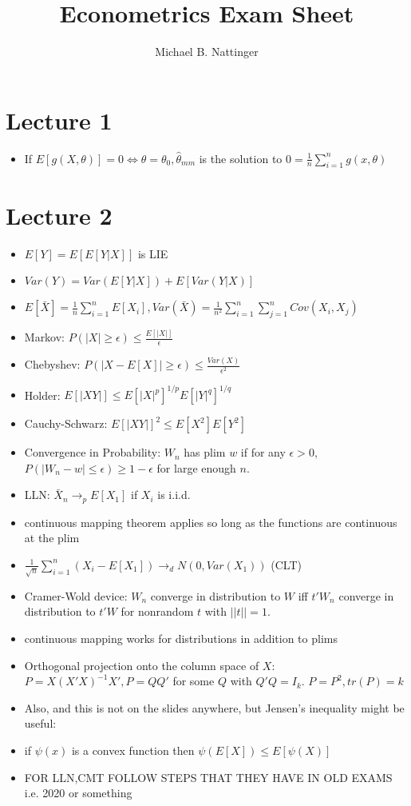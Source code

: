 \documentclass[11pt]{article} %
\title{Econometrics Exam Sheet}
\author{Michael B. Nattinger}
\begin{document}
\maketitle

\section{Lecture 1}
\begin{itemize}
\item If $E[g(X,\theta)] = 0 \iff \theta = \theta_0, \hat{\theta}_{mm}$ is the solution to $0 =  \frac{1}{n}\sum_{i=1}^n g(x,\theta)$
\end{itemize}
\section{Lecture 2}
\begin{itemize}
\item $E[Y] = E[E[Y|X]]$ is LIE
\item $Var(Y) = Var(E[Y|X]) + E[Var(Y|X)]$
\item $E[\bar{X}] = \frac{1}{n}\sum_{i=1}^n E[X_i], Var(\bar{X}) = \frac{1}{n^2}\sum_{i=1}^n\sum_{j=1}^n Cov(X_i,X_j)$
\item Markov: $P(|X|\geq \epsilon) \leq \frac{E[|X|]}{\epsilon}$
\item Chebyshev: $P(|X-E[X]| \geq \epsilon) \leq \frac{Var(X)}{\epsilon^2}$
\item Holder: $E[|XY|] \leq E[|X|^p]^{1/p}E[|Y|^q]^{1/q}$
\item Cauchy-Schwarz: $E[|XY|]^2\leq E[X^2]E[Y^2]$
\item Convergence in Probability: $W_n$ has plim $w$ if for any $\epsilon>0$, $P(|W_n - w|\leq \epsilon) \geq 1-\epsilon$ for large enough $n$.
\item LLN: $\bar{X}_n \rightarrow_p E[X_1] $ if $X_i $ is i.i.d. 
\item continuous mapping theorem applies so long as the functions are continuous at the plim
\item $\frac{1}{\sqrt{n}}\sum_{i=1}^n (X_i - E[X_1]) \rightarrow_d N(0,Var(X_1))$ (CLT)
\item Cramer-Wold device: $W_n$ converge in distribution to $W$ iff $t'W_n$ converge in distribution to $t'W$ for nonrandom $t$ with $||t|| = 1.$
\item continuous mapping works for distributions in addition to plims
\item Orthogonal projection onto the column space of $X$: $P = X(X'X)^{-1}X', P = QQ' $ for some $Q$ with $ Q'Q = I_k$. $P=P^2,tr(P) = k$
\item Also, and this is not on the slides anywhere, but Jensen's inequality might be useful:
\item if $\psi(x)$ is a convex function then $\psi(E[X])\leq E[\psi(X)]$
\item FOR LLN,CMT FOLLOW STEPS THAT THEY HAVE IN OLD EXAMS i.e. 2020 or something
\end{itemize}
\end{document}
